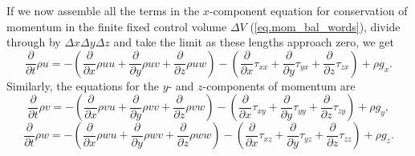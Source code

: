 \documentclass[a4paper,11pt]		{report}
\begin{document}
If we now assemble all the terms in the $x$-component equation for
conservation of momentum in the finite fixed control volume $\Delta V$
(\ref{eq.mom_bal_words}), divide through by $\Delta x\Delta y\Delta z$
and take the limit as these lengths approach zero, we get
\begin{equation}
\frac{\partial}{\partial t}\rho u=
-\left(
\frac{\partial}{\partial x}\rho uu+
\frac{\partial}{\partial y}\rho uv+
\frac{\partial}{\partial z}\rho uw
\right)
-\left(
\frac{\partial}{\partial x}\tau_{xx}+
\frac{\partial}{\partial y}\tau_{yx}+
\frac{\partial}{\partial z}\tau_{zx}
\right)
+\rho g_x.
\end{equation}
Similarly, the equations for the $y$- and $z$-components of momentum are
\begin{equation}
\frac{\partial}{\partial t}\rho v=
-\left(
\frac{\partial}{\partial x}\rho vu+
\frac{\partial}{\partial y}\rho vv+
\frac{\partial}{\partial z}\rho vw
\right)
-\left(
\frac{\partial}{\partial x}\tau_{xy}+
\frac{\partial}{\partial y}\tau_{yy}+
\frac{\partial}{\partial z}\tau_{zy}
\right)
+\rho g_y,
\end{equation}
\begin{equation}
\frac{\partial}{\partial t}\rho w=
-\left(
\frac{\partial}{\partial x}\rho wu+
\frac{\partial}{\partial y}\rho wv+
\frac{\partial}{\partial z}\rho ww
\right)
-\left(
\frac{\partial}{\partial x}\tau_{xz}+
\frac{\partial}{\partial y}\tau_{yz}+
\frac{\partial}{\partial z}\tau_{zz}
\right)
+\rho g_z.
\end{equation}
\end{document}
